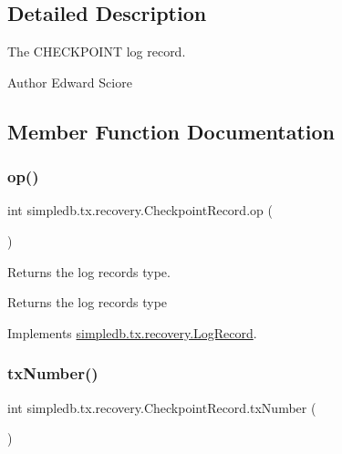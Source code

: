 \subsection{Detailed Description}
The C\+H\+E\+C\+K\+P\+O\+I\+NT log record. \begin{DoxyAuthor}{Author}
Edward Sciore 
\end{DoxyAuthor}


\subsection{Member Function Documentation}
\mbox{\label{classsimpledb_1_1tx_1_1recovery_1_1CheckpointRecord_add91e88d6b4eb9ed6cfff2d8d8cc021f}} 
\subsubsection{\texorpdfstring{op()}{op()}}
{\footnotesize\ttfamily int simpledb.\+tx.\+recovery.\+Checkpoint\+Record.\+op (\begin{DoxyParamCaption}{ }\end{DoxyParamCaption})\hspace{0.3cm}{\ttfamily [inline]}}

Returns the log record\textquotesingle{}s type. \begin{DoxyReturn}{Returns}
the log record\textquotesingle{}s type 
\end{DoxyReturn}


Implements \hyperlink{interfacesimpledb_1_1tx_1_1recovery_1_1LogRecord_aa97a8907de4709c2b3596e8c9709a26c}{simpledb.\+tx.\+recovery.\+Log\+Record}.

\mbox{\label{classsimpledb_1_1tx_1_1recovery_1_1CheckpointRecord_aea455bb47be4edb732b0da09ca308dda}} 
\subsubsection{\texorpdfstring{tx\+Number()}{txNumber()}}
{\footnotesize\ttfamily int simpledb.\+tx.\+recovery.\+Checkpoint\+Record.\+tx\+Number (\begin{DoxyParamCaption}{ }\end{DoxyParamCaption})\hspace{0.3cm}{\ttfamily [inline]}}

